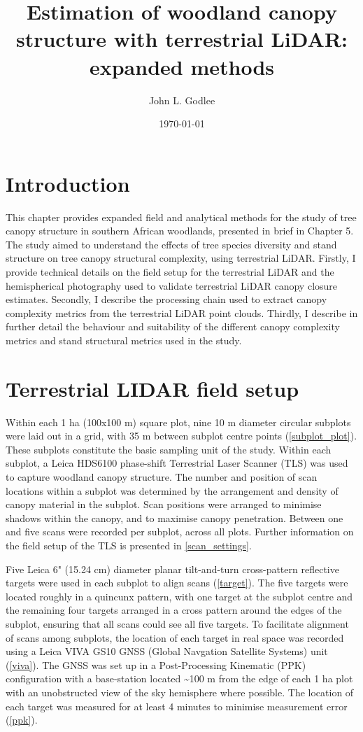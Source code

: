\documentclass[11pt,a4paper]{article}
\title{Estimation of woodland canopy structure with terrestrial LiDAR: expanded methods}
\author{John L. Godlee}
\date{\today}
\begin{document}
\maketitle{}

\linenumbers

\section{Introduction}

This chapter provides expanded field and analytical methods for the study of tree canopy structure in southern African woodlands, presented in brief in Chapter 5. The study aimed to understand the effects of tree species diversity and stand structure on tree canopy structural complexity, using terrestrial LiDAR. Firstly, I provide technical details on the field setup for the terrestrial LiDAR and the hemispherical photography used to validate terrestrial LiDAR canopy closure estimates. Secondly, I describe the processing chain used to extract canopy complexity metrics from the terrestrial LiDAR point clouds. Thirdly, I describe in further detail the behaviour and suitability of the different canopy complexity metrics and stand structural metrics used in the study.

\section{Terrestrial LIDAR field setup}

Within each 1 ha (100x100 m) square plot, nine 10 m diameter circular subplots were laid out in a grid, with 35 m between subplot centre points (\autoref{subplot_plot}). These subplots constitute the basic sampling unit of the study. Within each subplot, a Leica HDS6100 phase-shift Terrestrial Laser Scanner (TLS) was used to capture woodland canopy structure. The number and position of scan locations within a subplot was determined by the arrangement and density of canopy material in the subplot. Scan positions were arranged to minimise shadows within the canopy, and to maximise canopy penetration. Between one and five scans were recorded per subplot, across all plots. Further information on the field setup of the TLS is presented in \autoref{scan_settings}.

Five Leica 6" (15.24 cm) diameter planar tilt-and-turn cross-pattern reflective targets were used in each subplot to align scans (\autoref{target}). The five targets were located roughly in a quincunx pattern, with one target at the subplot centre and the remaining four targets arranged in a cross pattern around the edges of the subplot, ensuring that all scans could see all five targets. To facilitate alignment of scans among subplots, the location of each target in real space was recorded using a Leica VIVA GS10 GNSS (Global Navgation Satellite Systems) unit (\autoref{viva}). The GNSS was set up in a Post-Processing Kinematic (PPK) configuration with a base-station located \textasciitilde{}100 m from the edge of each 1 ha plot with an unobstructed view of the sky hemisphere where possible. The location of each target was measured for at least 4 minutes to minimise measurement error (\autoref{ppk}). 
\end{document}
